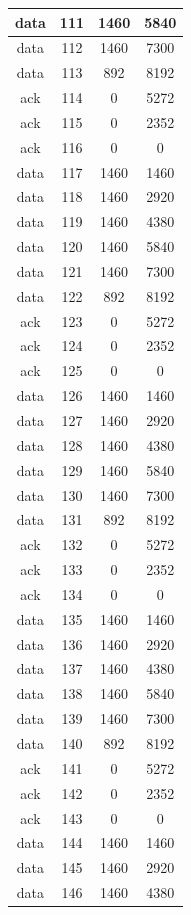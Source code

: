 \documentclass[a4paper,11pt,final]{report}
\begin{document}
\begin{longtable}{|c|c|c|c|}
data & 111 & 1460 & 5840 \\ \hline
data & 112 & 1460 & 7300 \\ \hline
data & 113 & 892 & 8192 \\ \hline
ack & 114 & 0 & 5272 \\ \hline
ack & 115 & 0 & 2352 \\ \hline
ack & 116 & 0 & 0 \\ \hline
data & 117 & 1460 & 1460 \\ \hline
data & 118 & 1460 & 2920 \\ \hline
data & 119 & 1460 & 4380 \\ \hline
data & 120 & 1460 & 5840 \\ \hline
data & 121 & 1460 & 7300 \\ \hline
data & 122 & 892 & 8192 \\ \hline
ack & 123 & 0 & 5272 \\ \hline
ack & 124 & 0 & 2352 \\ \hline
ack & 125 & 0 & 0 \\ \hline
data & 126 & 1460 & 1460 \\ \hline
data & 127 & 1460 & 2920 \\ \hline
data & 128 & 1460 & 4380 \\ \hline
data & 129 & 1460 & 5840 \\ \hline
data & 130 & 1460 & 7300 \\ \hline
data & 131 & 892 & 8192 \\ \hline
ack & 132 & 0 & 5272 \\ \hline
ack & 133 & 0 & 2352 \\ \hline
ack & 134 & 0 & 0 \\ \hline
data & 135 & 1460 & 1460 \\ \hline
data & 136 & 1460 & 2920 \\ \hline
data & 137 & 1460 & 4380 \\ \hline
data & 138 & 1460 & 5840 \\ \hline
data & 139 & 1460 & 7300 \\ \hline
data & 140 & 892 & 8192 \\ \hline
ack & 141 & 0 & 5272 \\ \hline
ack & 142 & 0 & 2352 \\ \hline
ack & 143 & 0 & 0 \\ \hline
data & 144 & 1460 & 1460 \\ \hline
data & 145 & 1460 & 2920 \\ \hline
data & 146 & 1460 & 4380 \\ \hline

\end{longtable}
\end{document}
